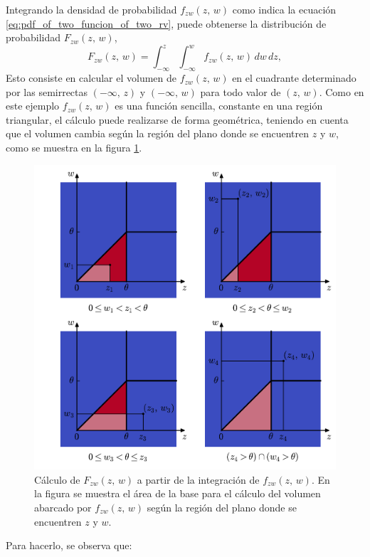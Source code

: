 \documentclass[a4paper]{report}
\begin{document}
Integrando la densidad de probabilidad \(f_{zw}(z,\,w)\) como indica la ecuación \ref{eq:pdf_of_two_funcion_of_two_rv}, puede obtenerse la distribución de probabilidad \(F_{zw}(z,\,w)\),
\[
 F_{zw}(z,\,w)=\int_{-\infty}^{z}\int_{-\infty}^{w}f_{zw}(z,\,w)\,dw\,dz,
\]
Esto consiste en calcular el volumen de \(f_{zw}(z,\,w)\) en el cuadrante determinado por las semirrectas \((-\infty,\,z)\) y \((-\infty,\,w)\) para todo valor de \((z,\,w)\). Como en este ejemplo \(f_{zw}(z,\,w)\) es una función sencilla, constante en una región triangular, el cálculo puede realizarse de forma geométrica, teniendo en cuenta que el volumen cambia según la región del plano donde se encuentren \(z\) y \(w\), como se muestra en la figura \ref{fig:joint_density_function_rv_min_max_integration}.
\begin{figure}[!htb]
\begin{center}
 \includegraphics[width=0.85\columnwidth]{figuras/joint_density_function_rv_min_max_integration.pdf}
\caption{\label{fig:joint_density_function_rv_min_max_integration} Cálculo de \(F_{zw}(z,\,w)\) a partir de la integración de \(f_{zw}(z,\,w)\). En la figura se muestra el área de la base para el cálculo del volumen abarcado por \(f_{zw}(z,\,w)\) según la región del plano donde se encuentren \(z\) y \(w\).}
\end{center}
\end{figure}
Para hacerlo, se observa que:
\end{document}
